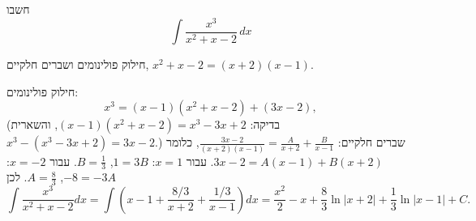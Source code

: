 
\begin{question}
חשבו
\[ \int\frac{x^3}{x^2+x-2}\,dx \]
\end{question}

\begin{hint}
חילוק פולינומים ושברים חלקיים, $x^2+x-2=(x+2)(x-1)$.
\end{hint}

\begin{solution}
חילוק פולינומים:
\[ x^3=(x-1)(x^2+x-2)+(3x-2), \]
(בדיקה: $(x-1)(x^2+x-2)=x^3-3x+2$, והשארית $x^3-(x^3-3x+2)=3x-2$.) שברים חלקיים: $\frac{3x-2}{(x+2)(x-1)}=\frac{A}{x+2}+\frac{B}{x-1}$, כלומר $3x-2=A(x-1)+B(x+2)$. עבור $x=1$: $1=3B$, $B=\frac13$. עבור $x=-2$: $-8=-3A$, $A=\frac83$. לכן
\[ \int\frac{x^3}{x^2+x-2}dx=\int\left(x-1+\frac{8/3}{x+2}+\frac{1/3}{x-1}\right)dx=\boxed{\frac{x^2}{2}-x+\frac83\ln|x+2|+\frac13\ln|x-1|+C}. \]
\end{solution}
